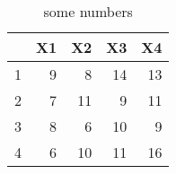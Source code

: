 \begin{table}[ht]
\centering
\begin{tabular}{rrrrr}
  \hline
 & X1 & X2 & X3 & X4 \\ 
  \hline
1 &   9 &   8 &  14 &  13 \\ 
  2 &   7 &  11 &   9 &  11 \\ 
  3 &   8 &   6 &  10 &   9 \\ 
  4 &   6 &  10 &  11 &  16 \\ 
   \hline
\end{tabular}
\caption{some numbers} 
\label{t1}
\end{table}
